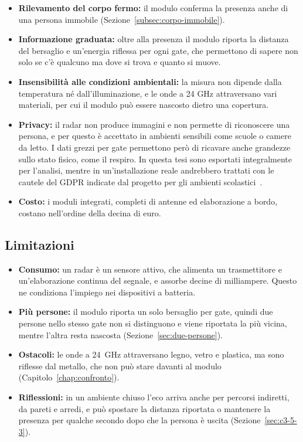 \begin{itemize}
    \item \textbf{Rilevamento del corpo fermo:} il modulo conferma la presenza anche di una persona immobile (Sezione~\ref{subsec:corpo-immobile}).

    \item \textbf{Informazione graduata:} oltre alla presenza il modulo riporta la distanza del bersaglio e un'energia riflessa per ogni gate, che permettono di sapere non solo se c'è qualcuno ma dove si trova e quanto si muove.

    \item \textbf{Insensibilità alle condizioni ambientali:} la misura non dipende dalla temperatura né dall'illuminazione, e le onde a 24 GHz attraversano vari materiali, per cui il modulo può essere nascosto dietro una copertura.

    \item \textbf{Privacy:} il radar non produce immagini e non permette di riconoscere una persona, e per questo è accettato in ambienti sensibili come scuole o camere da letto. I dati grezzi per gate permettono però di ricavare anche grandezze sullo stato fisico, come il respiro. In questa tesi sono esportati integralmente per l'analisi, mentre in un'installazione reale andrebbero trattati con le cautele del GDPR indicate dal progetto per gli ambienti scolastici~\cite{callisto2026dipme}.

    \item \textbf{Costo:} i moduli integrati, completi di antenne ed elaborazione a bordo, costano nell'ordine della decina di euro.
\end{itemize}

\subsection{Limitazioni}
\label{subsec:mmwave-limiti}

\begin{itemize}
    \item \textbf{Consumo:} un radar è un sensore attivo, che alimenta un trasmettitore e un'elaborazione continua del segnale, e assorbe decine di milliampere. Questo ne condiziona l'impiego nei dispositivi a batteria.

    \item \textbf{Più persone:} il modulo riporta un solo bersaglio per gate, quindi due persone nello stesso gate non si distinguono e viene riportata la più vicina, mentre l'altra resta nascosta (Sezione~\ref{sec:due-persone}).

    \item \textbf{Ostacoli:} le onde a 24~GHz attraversano legno, vetro e plastica, ma sono riflesse dal metallo, che non può stare davanti al modulo (Capitolo~\ref{chap:confronto}).

    \item \textbf{Riflessioni:} in un ambiente chiuso l'eco arriva anche per percorsi indiretti, da pareti e arredi, e può spostare la distanza riportata o mantenere la presenza per qualche secondo dopo che la persona è uscita (Sezione~\ref{sec:c3-5-3}).
\end{itemize}


